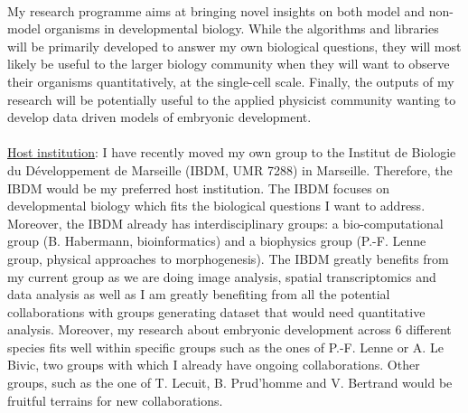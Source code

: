 \paragraph{}My research programme aims at bringing novel insights on both model and non-model organisms in developmental biology.
While the algorithms and libraries will be primarily developed to answer my own biological questions, they will most likely be useful to the larger biology community when they will want to observe their organisms quantitatively, at the single-cell scale.
Finally, the outputs of my research will be potentially useful to the applied physicist community wanting to develop data driven models of embryonic development.
\paragraph{}\underline{Host institution}: I have recently moved my own group to the Institut de Biologie du Développement de Marseille (IBDM, UMR 7288) in Marseille.
Therefore, the IBDM would be my preferred host institution.
The IBDM focuses on developmental biology which fits the biological questions I want to address.
Moreover, the IBDM already has interdisciplinary groups: a bio-computational group (B. Habermann, bioinformatics) and a biophysics group (P.-F. Lenne group, physical approaches to morphogenesis).
The IBDM greatly benefits from my current group as we are doing image analysis, spatial transcriptomics and data analysis as well as I am greatly benefiting from all the potential collaborations with groups generating dataset that would need quantitative analysis.
Moreover, my research about embryonic development across 6 different species fits well within specific groups such as the ones of P.-F. Lenne or A. Le Bivic, two groups with which I already have ongoing collaborations.
Other groups, such as the one of T. Lecuit, B. Prud’homme and V. Bertrand would be fruitful terrains for new collaborations.
